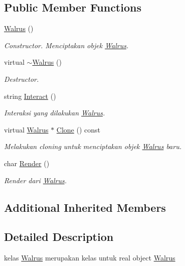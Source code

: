 \subsection*{Public Member Functions}
\begin{DoxyCompactItemize}
\item 
\hyperlink{classWalrus_a75c3d200b57a5c9fbcef9d8dc8247bf3}{Walrus} ()
\begin{DoxyCompactList}\small\item\em Constructor. Menciptakan objek \hyperlink{classWalrus}{Walrus}. \end{DoxyCompactList}\item 
virtual \hyperlink{classWalrus_a0dbf8812cdde2fecc53bee6823ff0119}{$\sim$\+Walrus} ()
\begin{DoxyCompactList}\small\item\em Destructor. \end{DoxyCompactList}\item 
string \hyperlink{classWalrus_aa21a90ecf8aff97c4cf90a59449ce02c}{Interact} ()
\begin{DoxyCompactList}\small\item\em Interaksi yang dilakukan \hyperlink{classWalrus}{Walrus}. \end{DoxyCompactList}\item 
virtual \hyperlink{classWalrus}{Walrus} $\ast$ \hyperlink{classWalrus_a9644eb3d51eb945b716bd37e25c7470e}{Clone} () const 
\begin{DoxyCompactList}\small\item\em Melakukan cloning untuk menciptakan objek \hyperlink{classWalrus}{Walrus} baru. \end{DoxyCompactList}\item 
char \hyperlink{classWalrus_a143f948e4c45e13a67f893caa435475d}{Render} ()
\begin{DoxyCompactList}\small\item\em Render dari \hyperlink{classWalrus}{Walrus}. \end{DoxyCompactList}\end{DoxyCompactItemize}
\subsection*{Additional Inherited Members}


\subsection{Detailed Description}
kelas \hyperlink{classWalrus}{Walrus} merupakan kelas untuk real object \hyperlink{classWalrus}{Walrus} 

